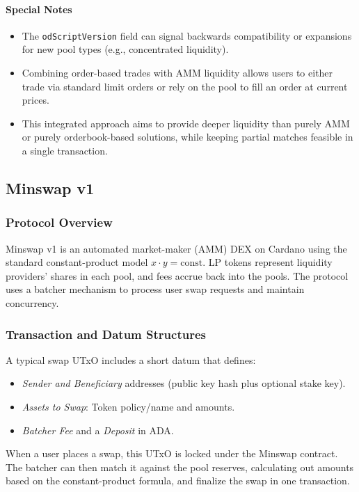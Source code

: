 \documentclass{article}
\begin{document}
\paragraph{Special Notes}
\begin{itemize}
    \item The \texttt{odScriptVersion} field can signal backwards compatibility or expansions for new pool types (e.g., concentrated liquidity).
    \item Combining order-based trades with AMM liquidity allows users to either trade via standard limit orders or rely on the pool to fill an order at current prices.
    \item This integrated approach aims to provide deeper liquidity than purely AMM or purely orderbook-based solutions, while keeping partial matches feasible in a single transaction.
\end{itemize}



\subsection{Minswap v1}
\label{sec:minswap_v1}

\subsubsection{Protocol Overview}
Minswap v1 is an automated market-maker (AMM) DEX on Cardano using the standard constant-product model \( x \cdot y = \mathrm{const}\). LP tokens represent liquidity providers’ shares in each pool, and fees accrue back into the pools. The protocol uses a batcher mechanism to process user swap requests and maintain concurrency.

\subsubsection{Transaction and Datum Structures}
A typical swap UTxO includes a short datum that defines:
\begin{itemize}
    \item \emph{Sender and Beneficiary} addresses (public key hash plus optional stake key).
    \item \emph{Assets to Swap}: Token policy/name and amounts.
    \item \emph{Batcher Fee} and a \emph{Deposit} in ADA.
\end{itemize}
When a user places a swap, this UTxO is locked under the Minswap contract. The batcher can then match it against the pool reserves, calculating out amounts based on the constant-product formula, and finalize the swap in one transaction.
\end{document}

